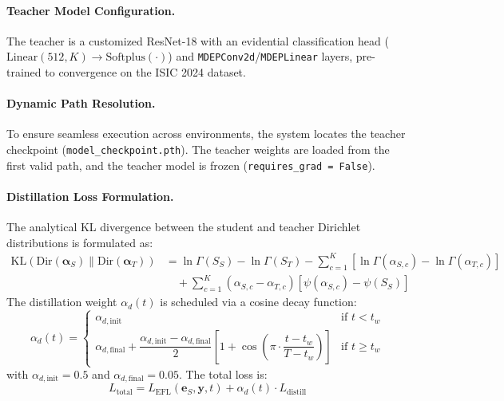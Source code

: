 \documentclass[letterpaper]{article} %
\newcommand{\Dir}{\text{Dir}}
\newcommand{\KL}{\text{KL}}
\newcommand{\softplus}{\text{Softplus}}
\begin{document}
\paragraph{Teacher Model Configuration.}
The teacher is a customized ResNet-18 with an evidential classification head ($\text{Linear}(512, K) \to \softplus(\cdot)$) and \texttt{MDEPConv2d}/\texttt{MDEPLinear} layers, pre-trained to convergence on the ISIC 2024 dataset.

\paragraph{Dynamic Path Resolution.}
To ensure seamless execution across environments, the system locates the teacher checkpoint (\texttt{model\_checkpoint.pth}). The teacher weights are loaded from the first valid path, and the teacher model is frozen (\texttt{requires\_grad = False}).

\paragraph{Distillation Loss Formulation.}
The analytical KL divergence between the student and teacher Dirichlet distributions is formulated as:
\begin{align}
    \KL(\Dir(\bm{\alpha}_S) \| \Dir(\bm{\alpha}_T)) &= \ln\Gamma(S_S) - \ln\Gamma(S_T) - \sum_{c=1}^K \left[\ln\Gamma(\alpha_{S,c}) - \ln\Gamma(\alpha_{T,c})\right] \nonumber \\
    &\quad + \sum_{c=1}^K (\alpha_{S,c} - \alpha_{T,c})\left[\psi(\alpha_{S,c}) - \psi(S_S)\right] \label{eq:dir_kl_full_app}
\end{align}
The distillation weight $\alpha_d(t)$ is scheduled via a cosine decay function:
\begin{equation}\label{eq:alpha_d}
    \alpha_d(t) = \begin{cases}
        \alpha_{d,\text{init}} & \text{if } t < t_w \\[6pt]
        \alpha_{d,\text{final}} + \dfrac{\alpha_{d,\text{init}} - \alpha_{d,\text{final}}}{2}\left[1 + \cos\!\left(\pi \cdot \dfrac{t - t_w}{T - t_w}\right)\right] & \text{if } t \ge t_w
    \end{cases}
\end{equation}
with $\alpha_{d,\text{init}} = 0.5$ and $\alpha_{d,\text{final}} = 0.05$. The total loss is:
\begin{equation}\label{eq:total_loss_app}
    L_{\text{total}} = L_{\text{EFL}}(\bm{e}_S, \bm{y}, t) + \alpha_d(t) \cdot L_{\text{distill}}
\end{equation}
\end{document}
